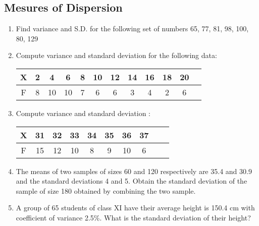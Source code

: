 \documentclass[17pt]{extarticle}
\begin{document}
\begin{multicols}{2}
\section{Mesures of Dispersion}
\noindent
\begin{enumerate}
\item Find variance and S.D. for the following set of numbers 65, 77, 81, 98, 100, 80, 129

\item Compute variance and standard deviation for the following data:

\begin{tabular}{|c|*{11}{c|}}
\hline X & 2 & 4 & 6 & 8 & 10 & 12 & 14 & 16 & 18 & 20  \\
\hline F & 8 & 10 & 10 & 7 & 6 & 6 & 3 & 4 & 2 & 6 \\
\hline
\end{tabular}

\item Compute variance and standard deviation :

\begin{tabular}{|c|*{9}{c|}}
\hline X & 31 & 32 & 33 & 34 & 35 & 36 & 37 \\
\hline F & 15 & 12 & 10 & 8 & 9 & 10 & 6 \\
\hline
\end{tabular}

\item The means of two samples of sizes 60 and 120 respectively are 35.4 and 30.9 and the standard deviations 4 and 5. Obtain the standard deviation of the sample of size 180 obtained by combining the two sample.

\item A group of 65 students of class XI have their average height is 150.4 cm with coefficient of variance 2.5\%. What is the standard deviation of their height?

\end{enumerate} 



\end{multicols}
 
\end{document}
